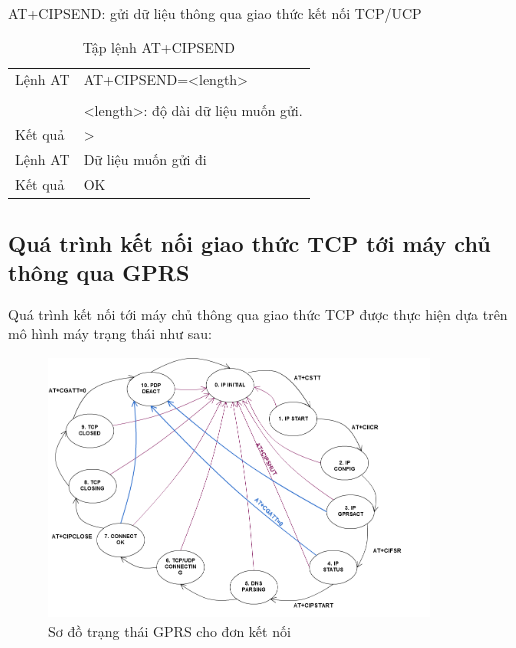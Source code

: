 AT+CIPSEND: gửi dữ liệu thông qua giao thức kết nối TCP/UCP
\begin{table}[htp]
\label{table:AT+CIPSEND}
\begin{tabular}{|l|l|}
\hline
Lệnh AT & AT+CIPSEND=<length> \\ 
& \\
& <length>: độ dài dữ liệu muốn gửi.\\\hline
Kết quả  & >  \\ \hline
Lệnh AT & Dữ liệu muốn gửi đi \\ \hline
Kết quả  & OK  \\ \hline
\end{tabular}

\caption[Tập lệnh AT+CIPSEND: gửi dữ liệu qua giao thức TCP/UCP]{Tập lệnh AT+CIPSEND}
\end{table}







\newpage

\subsection*{Quá trình kết nối giao thức TCP tới máy chủ thông qua GPRS}
Quá trình kết nối tới máy chủ thông qua giao thức TCP được thực hiện dựa trên mô hình máy trạng thái như sau:


\begin{center}
\begin{figure}[htpd]
\centering    
\includegraphics[width=0.9\textwidth]{sim800_status}
\caption[Sơ đồ trạng thái GPRS cho đơn kết nối]{Sơ đồ trạng thái GPRS cho đơn kết nối}
\label{fig:sim800_status}
\end{figure}
\end{center}

